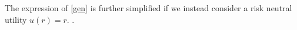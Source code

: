 \documentclass{article}
\begin{document}
The expression of \eqref{gen} is further simplified if we instead consider a risk neutral
utility $u(r) = r$. .






\end{document}

